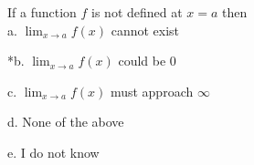 
If a function \(f\) is not defined at \(x = a\) then\\

a. $\displaystyle \lim_{x \rightarrow a}f(x)$ cannot exist

*b. $\displaystyle \lim_{x \rightarrow a}f(x)$ could be 0

c. $\displaystyle \lim_{x \rightarrow a}f(x)$ must approach $\infty$

d. None of the above

e. I do not know
